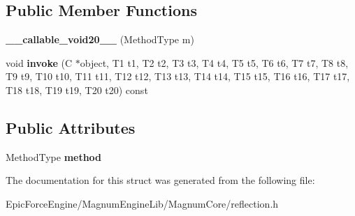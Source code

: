 \subsection*{Public Member Functions}
\begin{DoxyCompactItemize}
\item 
{\bfseries \+\_\+\+\_\+callable\+\_\+void20\+\_\+\+\_\+} (Method\+Type m)\hypertarget{structagm_1_1reflection_1_1____callable__void20_____ac5409824c4a51d66892d6ef2dd79ba61}{}\label{structagm_1_1reflection_1_1____callable__void20_____ac5409824c4a51d66892d6ef2dd79ba61}

\item 
void {\bfseries invoke} (C $\ast$object, T1 t1, T2 t2, T3 t3, T4 t4, T5 t5, T6 t6, T7 t7, T8 t8, T9 t9, T10 t10, T11 t11, T12 t12, T13 t13, T14 t14, T15 t15, T16 t16, T17 t17, T18 t18, T19 t19, T20 t20) const \hypertarget{structagm_1_1reflection_1_1____callable__void20_____a88401614102a8aa3bd8467a19097319d}{}\label{structagm_1_1reflection_1_1____callable__void20_____a88401614102a8aa3bd8467a19097319d}

\end{DoxyCompactItemize}
\subsection*{Public Attributes}
\begin{DoxyCompactItemize}
\item 
Method\+Type {\bfseries method}\hypertarget{structagm_1_1reflection_1_1____callable__void20_____a74779eeb07193fef1d46c40f39c98228}{}\label{structagm_1_1reflection_1_1____callable__void20_____a74779eeb07193fef1d46c40f39c98228}

\end{DoxyCompactItemize}


The documentation for this struct was generated from the following file\+:\begin{DoxyCompactItemize}
\item 
Epic\+Force\+Engine/\+Magnum\+Engine\+Lib/\+Magnum\+Core/reflection.\+h\end{DoxyCompactItemize}
